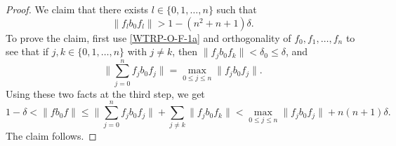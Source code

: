 \documentclass[11pt]{amsart}
\theoremstyle{plain}
\theoremstyle{definition}
\theoremstyle{remark}
\numberwithin{equation}{section}
\newcommand{\dt}{\delta}
\begin{document}
\begin{proof}
We claim that there exists $l \in \{0, 1, \ldots, n \}$
such that
\[
\| f_l b_0 f_l \| > 1 - (n^2 + n + 1) \dt.
\]
To prove the claim,
first use \eqref{WTRP-O-F-1a}
and orthogonality of $f_{0}, f_{1}, \ldots, f_{n}$
to see that if $j, k \in \{0, 1, \ldots, n \}$ with $j \neq k$,
then $\| f_j b_0 f_k \| < \dt_0 \leq \dt$,
and
\[
\Bigg\| \sum_{j = 0}^{n} f_j b_0 f_j \Bigg\|
 = \max_{0 \leq j \leq n} \| f_j b_0 f_j \|.
\]
Using these two facts at the third step,
we get
\[
1 - \dt
 < \| f b_0 f \|
 \leq \Bigg\| \sum_{j = 0}^{n} f_j b_0 f_j \Bigg\|
      + \sum_{j \neq k} \| f_j b_0 f_k \|
 < \max_{0 \leq j \leq n} \| f_j b_0 f_j \| + n (n + 1) \dt.
\]
The claim follows.


\end{proof}
\end{document}
